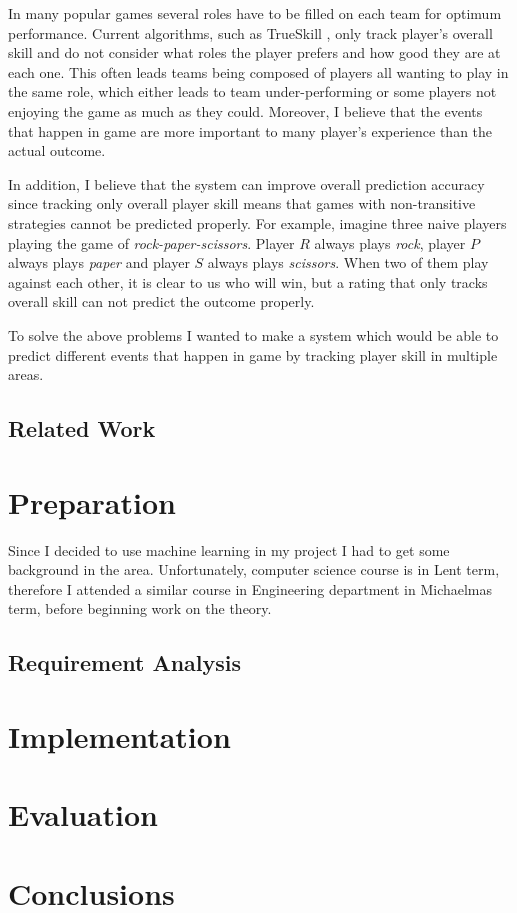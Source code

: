 \documentclass[12pt,a4paper]{report}
\begin{document}
In many popular games several roles have to be filled on each team for optimum performance.
Current algorithms, such as TrueSkill \cite{trueskill}, only track player's overall skill and do not consider what roles the player prefers and how good they are at each one.
This often leads teams being composed of players all wanting to play in the same role, which either leads to team under-performing or some players not enjoying the game as much as they could.
Moreover, I believe that the events that happen in game are more important to many player's experience than the actual outcome.

In addition, I believe that the system can improve overall prediction accuracy since tracking only overall player skill means that games with non-transitive strategies cannot be predicted properly. %
For example, imagine three naive players playing the game of \emph{rock-paper-scissors}.
Player $R$ always plays \textit{rock}, player $P$ always plays \textit{paper} and player $S$ always plays \textit{scissors}.
When two of them play against each other, it is clear to us who will win, but a rating that only tracks overall skill can not predict the outcome properly.

To solve the above problems I wanted to make a system which would be able to predict different events that happen in game by tracking player skill in multiple areas.

\section{Related Work}
\chapter{Preparation}
Since I decided to use machine learning in my project I had to get some background in the area.
Unfortunately, computer science course is in Lent term, therefore I attended a similar course in Engineering department in Michaelmas term, before beginning work on the theory.
\section{Requirement Analysis}

\chapter{Implementation}
\chapter{Evaluation}
\chapter{Conclusions}

\printbibliography
\appendix
\end{document}
